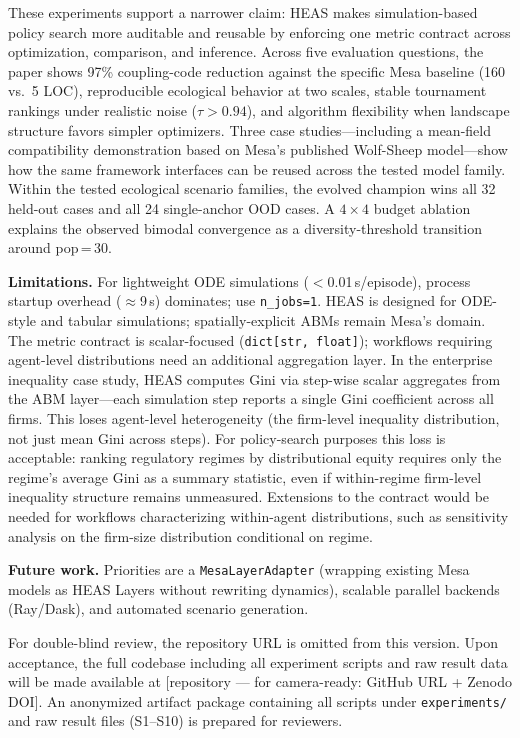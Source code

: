 \documentclass{wscpaperproc}
\begin{document}
These experiments support a narrower claim: HEAS makes simulation-based policy
search more auditable and reusable by enforcing one metric contract across
optimization, comparison, and inference. Across five evaluation questions, the
paper shows 97\% coupling-code reduction against the specific Mesa baseline
(160 vs.\ 5 LOC), reproducible ecological behavior at two scales, stable
tournament rankings under realistic noise ($\tau\!>\!0.94$), and algorithm
flexibility when landscape structure favors simpler optimizers. Three case
studies---including a mean-field compatibility demonstration based on Mesa's
published Wolf-Sheep model---show how the same framework interfaces can be
reused across the tested model family. Within the tested ecological scenario
families, the evolved champion wins all 32 held-out cases and all 24
single-anchor OOD cases. A $4\!\times\!4$ budget ablation explains the observed
bimodal convergence as a diversity-threshold transition around pop\,=\,30.

\textbf{Limitations.} For lightweight ODE simulations ($<$0.01\,s/episode),
process startup overhead ($\approx$9\,s) dominates; use \texttt{n\_jobs=1}.
HEAS is designed for ODE-style and tabular simulations; spatially-explicit ABMs
remain Mesa's domain. The metric contract is scalar-focused
(\texttt{dict[str, float]}); workflows requiring agent-level distributions need
an additional aggregation layer. In the enterprise inequality case study, HEAS
computes Gini via step-wise scalar aggregates from the ABM layer---each
simulation step reports a single Gini coefficient across all firms. This loses
agent-level heterogeneity (the firm-level inequality distribution, not just mean
Gini across steps). For policy-search purposes this loss is acceptable:
ranking regulatory regimes by distributional equity requires only the regime's
average Gini as a summary statistic, even if within-regime firm-level inequality
structure remains unmeasured. Extensions to the contract would be needed for
workflows characterizing within-agent distributions, such as sensitivity analysis
on the firm-size distribution conditional on regime.

\textbf{Future work.} Priorities are a \texttt{MesaLayerAdapter} (wrapping existing
Mesa models as HEAS Layers without rewriting dynamics), scalable parallel backends
(Ray/Dask), and automated scenario generation.

For double-blind review, the repository URL is omitted from this version.
Upon acceptance, the full codebase including all experiment scripts and raw
result data will be made available at [repository --- for camera-ready: GitHub
URL + Zenodo DOI]. An anonymized artifact package containing all scripts
under \texttt{experiments/} and raw result files (S1--S10) is prepared for
reviewers.
\end{document}
